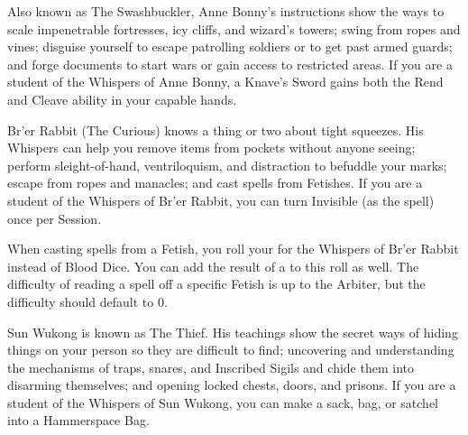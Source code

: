 {    Also known as The Swashbuckler, Anne Bonny's instructions show the ways to scale impenetrable fortresses, icy cliffs, and wizard's towers; swing from ropes and vines; disguise yourself to escape patrolling soldiers or to get past armed guards; and forge documents to start wars or gain access to restricted areas. If you are a student of the Whispers of Anne Bonny, a Knave's Sword gains both the Rend and Cleave ability in your capable hands.


    Br'er Rabbit (The Curious) knows a thing or two about tight squeezes.  His Whispers can help you remove items from pockets without anyone seeing; perform sleight-of-hand, ventriloquism, and distraction to befuddle your marks; escape from ropes and manacles; and cast spells from Fetishes.  If you are a student of the Whispers of Br'er Rabbit, you can turn Invisible (as the spell) once per Session.

    When casting spells from a Fetish, you roll your \KNAVE for the Whispers of Br'er Rabbit instead of Blood Dice.  You can add the result of a \LUCK to this roll as well. The difficulty of reading a spell off a specific Fetish is up to the Arbiter, but the difficulty should default to 0.   


    Sun Wukong is known as The Thief.  His teachings show the secret ways of hiding things on your person so they are difficult to find; uncovering and understanding the mechanisms of traps, snares, and Inscribed Sigils and chide them into disarming themselves; and opening locked chests, doors, and prisons.  If you are a student of the Whispers of Sun Wukong, you can make a sack, bag, or satchel into a Hammerspace Bag.




}
